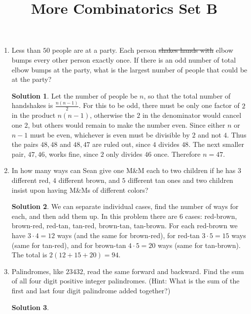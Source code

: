 \documentclass[twocolumn]{article}
\title{More Combinatorics Set B}
\author{}
\date{}
\theoremstyle{definition}
\newtheorem*{solution}{Solution}
\begin{document}
\maketitle
\begin{enumerate}
    \item Less than $50$ people are at a party.
        Each person \sout{shakes hands with} elbow bumps every other person exactly once.
        If there is an odd number of total elbow bumps at the party,
        what is the largest number of people that could be at the party?
        \begin{solution}
            Let the number of people be $n$,
            so that the total number of handshakes is $\frac{n(n - 1)}{2}$.
            For this to be odd, there must be only one factor of $2$ in the product $n(n - 1)$,
            otherwise the $2$ in the denominator would cancel one $2$, but others would remain to make the number even. Since either $n$ or $n - 1$ must be even,
            whichever is even must be divisible by $2$ and not $4$.
            Thus the pairs $48, 48$ and $48, 47$ are ruled out, since $4$ divides $48$.
            The next smaller pair, $47, 46$, works fine, since $2$ only divides $46$ once.
            Therefore $n = 47$.
        \end{solution}
    \item In how many ways can Sean give one M\&M each to two children
        if he has $3$ different red, $4$ different brown, and $5$ different tan ones
        and two children insist upon having M\&Ms of different colors?
        \vspace{3cm}
        \begin{solution}
            We can separate individual cases, find the number of ways for each,
            and then add them up.
            In this problem there are $6$ cases:
            red-brown, brown-red, red-tan, tan-red, brown-tan, tan-brown.
            For each red-brown we have $3 \cdot 4 = 12$ ways (and the same for brown-red),
            for red-tan $3 \cdot 5 = 15$ ways (same for tan-red),
            and for brown-tan $4 \cdot 5 = 20$ ways (same for tan-brown).
            The total is $2(12 + 15 + 20) = 94$.
        \end{solution}
    \item Palindromes, like $23432$, read the same forward and backward.
        Find the sum of all four digit positive integer palindromes.
        (Hint: What is the sum of the first and last four digit palindrome added together?)
        \begin{solution}

\end{solution}
\end{enumerate}
\end{document}
